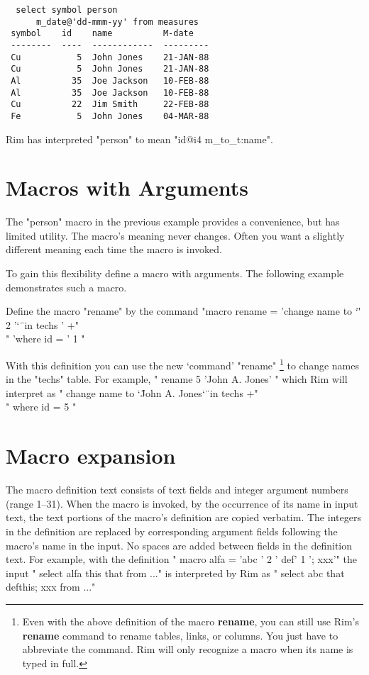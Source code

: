 \documentclass[11pt,a4paper]{report}
\def\I{\index}
\begin{document}
\I{select}
\begin{verbatim}
  select symbol person 
      m_date@'dd-mmm-yy' from measures
 symbol    id    name          M-date
 --------  ----  ------------  ---------
 Cu           5  John Jones    21-JAN-88
 Cu           5  John Jones    21-JAN-88
 Al          35  Joe Jackson   10-FEB-88
 Al          35  Joe Jackson   10-FEB-88
 Cu          22  Jim Smith     22-FEB-88
 Fe           5  John Jones    04-MAR-88
\end{verbatim}
 
Rim has interpreted "person" to mean
"id@i4 m\_to\_t:name".
 
\section{Macros with Arguments}
The "person" macro in the previous example provides a convenience,
but has limited utility.  The macro's meaning never changes.
Often you want a slightly different meaning
each time the macro is invoked.
 
To gain this flexibility define a macro
with arguments.
\I{argument}
The following example demonstrates such a macro.
 
Define the macro "rename" by the command
"macro rename = 'change name to \char`\"' 2 '\char`\"\ in techs ' +"\\
   \qquad " 'where id = ' 1 "
\label{rename-def}
 
With this definition
you can use the new `command' "rename"%
   \footnote{ Even with the above definition of the macro
   {\bf rename}, you can
    still use Rim's {\bf rename} command to rename tables, links, or
   columns.  You just have to abbreviate the command.
   Rim will only recognize a macro when its name
   is typed in full.}
to change names in
the "techs" table. For example,
" rename 5 'John A. Jones' "
which Rim will interpret as
" change name to \char`\"John A. Jones\char`\"\ in techs +"\\
   \qquad " where id = 5 "
 
\section{Macro expansion}
The macro definition text consists of text fields
and integer argument numbers (range 1--31).
When the macro is invoked,
by the occurrence of its name in input text, the text portions
of the macro's definition are copied verbatim.  The integers
in the definition are replaced by corresponding argument
fields following the macro's name in the input.
No spaces are added between fields in the definition text.
For example, with the definition
" macro alfa = 'abc ' 2 ' def' 1 '; xxx'"
the input
" select alfa this that from ..."
is interpreted by Rim as
" select abc that defthis; xxx from ..."
 
\end{document}
